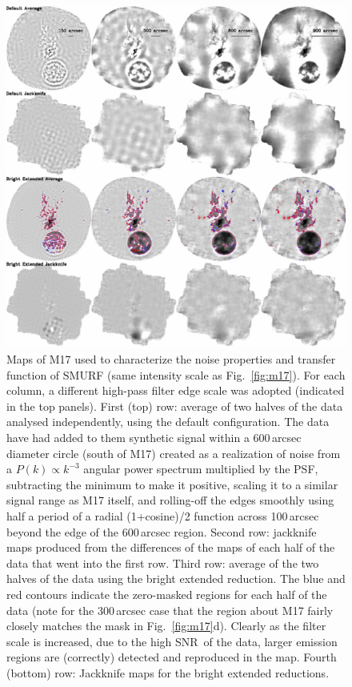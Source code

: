 \documentclass[useAMS,usenatbib,nofootinbib]{mn2e}
\newcommand{\snr}{SNR}
\begin{document}
\begin{figure}
\centering
\includegraphics[width=\linewidth]{m17_jk.pdf}
\caption{Maps of M17 used to characterize the noise properties and
transfer function of SMURF (same intensity scale as
Fig.~\ref{fig:m17}). For each column, a different high-pass filter
edge scale was adopted (indicated in the top panels). First (top) row:
average of two halves of the data analysed independently, using the
default configuration. The data have had added to them synthetic
signal within a 600\,arcsec diameter circle (south of M17) created as
a realization of noise from a $P(k) \propto k^{-3}$ angular power
spectrum multiplied by the PSF, subtracting the minimum to make it
positive, scaling it to a similar signal range as M17 itself, and
rolling-off the edges smoothly using half a period of a radial
(1+cosine)/2 function across 100\,arcsec beyond the edge of the
600\,arcsec region. Second row: jackknife maps produced from the
differences of the maps of each half of the data that went into the
first row. Third row: average of the two halves of the data using the
bright extended reduction. The blue and red contours indicate the
zero-masked regions for each half of the data (note for the
300\,arcsec case that the region about M17 fairly closely matches the
mask in Fig.~\ref{fig:m17}d). Clearly as the filter scale is
increased, due to the high \snr\ of the data, larger emission regions
are (correctly) detected and reproduced in the map. Fourth (bottom)
row: Jackknife maps for the bright extended reductions.}
\label{fig:m17_jk}
\end{figure}
\end{document}
